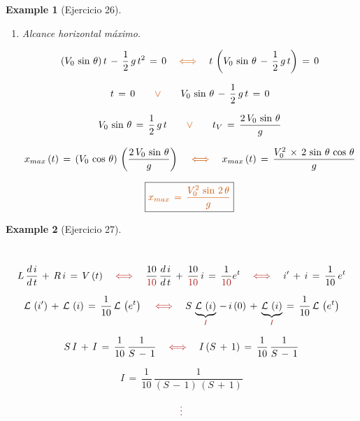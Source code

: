 \documentclass[a4paper,11pt,openany]{book}
\newtheorem{exmp}{Example}[section]
\newcommand*{\itembolasazules}[1]{%
\footnotesize\protect\tikz[baseline=-3pt]%
\protect\node[scale=.7, circle, shade, ball
color=green]{\color{white}\Large\bf#1};}
\begin{document}
\begin{exmp}[Ejercicio 26]
\begin{enumerate}[label=\itembolasazules{\arabic*}]
$$\mathcal{L}^{-\,1}\,\left(Y \right)\,=\,V_{0}\,\sin\,\theta\,\mathcal{L}^{-\,1}\,\left(\dfrac{1}{S^{2}} \right)\,-\,\dfrac{1}{\textcolor{burntorange}{2}}\,g\,\mathcal{L}^{-\,1}\,\left(\dfrac{\textcolor{burntorange}{2} }{S^{3}} \right)$$
 
$$\boxed{\textcolor{burntorange}{y\,(t)\,=\,(V_{0}\,\sin\,\theta)\,t\,-\,\dfrac{1}{2}\,g\,t^{2} } } $$
 
\item Alcance horizontal máximo.
 
$$(V_{0}\,\sin\,\theta)\,t\,-\,\dfrac{1}{2}\,g\,t^{2}\,=\,0 \quad \textcolor{burntorange}{\iff} \quad t\,\left(V_{0}\,\sin\,\theta\,-\,\dfrac{1}{2}\,g\,t \right)\,=\,0$$
 
$$t\,=\,0 \qquad \textcolor{burntorange}{\vee} \qquad V_{0}\,\sin\,\theta\,-\,\dfrac{1}{2}\,g\,t\,=\,0$$
 
$$V_{0}\,\sin\,\theta\,=\,\dfrac{1}{2}\,g\,t \qquad \textcolor{burntorange}{\vee} \qquad t_{V}\,=\,\dfrac{2\,V_{0}\,\sin\,\theta}{g}$$
 
\textcolor{burntorange}{ } $$x_{max}\,(t)\,=\,(V_{0}\,\cos\,\theta)\,\left(\dfrac{2\,V_{0}\,\sin\,\theta}{g} \right) \quad \textcolor{burntorange}{\iff} \quad x_{max}\,(t)\,=\,\dfrac{V_{0}^{2}\,\times\,2\,\sin\,\theta\,\cos\,\theta }{g}$$
 
$$\boxed{\textcolor{burntorange}{x_{max}\,=\,\dfrac{V_{0}^{2}\,\sin\,2\,\theta }{g} }} $$
 
\end{enumerate}
 
\end{exmp}
 
\begin{exmp}[Ejercicio 27]
 
 
\
 
\textcolor{carnelian}{}\, $$L\,\dfrac{d\,i}{d\,t}\,+\,R\,i\,=\,V\,(t) \quad \textcolor{carnelian}{\iff} \quad \dfrac{10}{\textcolor{carnelian}{10} }\,\dfrac{d\,i}{d\,t}\,+\,\dfrac{10}{\textcolor{carnelian}{10} }\,i\,=\,\dfrac{1}{\textcolor{carnelian}{10} }e^{t} \quad \textcolor{carnelian}{\iff} \quad i'\,+\,i\,=\,\dfrac{1}{10}\,e^{t}$$
 
$$\mathcal{L}\,\left(i' \right)\,+\,\mathcal{L}\,\left(i \right)\,=\,\dfrac{1}{10}\,\mathcal{L}\,\left(e^{t} \right) \quad \textcolor{carnelian}{\iff} \quad S\,\underbrace{\mathcal{L}\,\left(i \right)}_{\textcolor{carnelian}{I} }\,-\,i\,(0)\,+\,\underbrace{\mathcal{L}\,\left(i \right)}_{\textcolor{carnelian}{I}}\,=\,\dfrac{1}{10}\,\mathcal{L}\,\left(e^{t} \right)$$
 
$$S\,I\,+\,I\,=\,\dfrac{1}{10}\,\dfrac{1}{S\,-\,1} \quad \textcolor{carnelian}{\iff} \quad I\,(S\,+\,1)\,=\,\dfrac{1}{10}\,\dfrac{1}{S\,-\,1}$$
 
$$\boxed{I\,=\,\dfrac{1}{10}\,\dfrac{1}{(S\,-\,1)\,(S\,+\,1)}}$$
 
$$\textcolor{carnelian}{\vdots}$$
 
\end{exmp}
 
\end{document}
